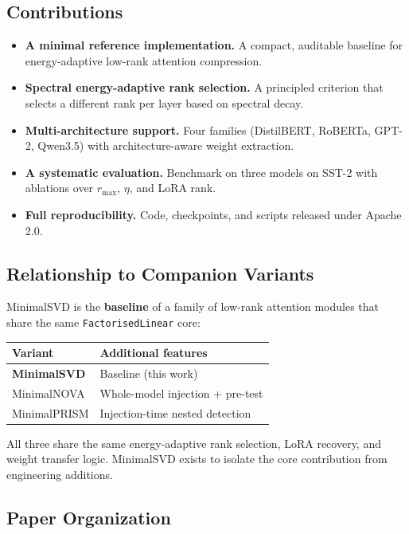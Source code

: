 \subsection{Contributions}

\begin{itemize}
\item \textbf{A minimal reference implementation.} A compact, auditable baseline for
  energy-adaptive low-rank attention compression.
\item \textbf{Spectral energy-adaptive rank selection.} A principled criterion that
  selects a different rank per layer based on spectral decay.
\item \textbf{Multi-architecture support.} Four families (DistilBERT, RoBERTa, GPT-2,
  Qwen3.5) with architecture-aware weight extraction.
\item \textbf{A systematic evaluation.} Benchmark on three models on SST-2 with
  ablations over $r_\text{max}$, $\eta$, and LoRA rank.
\item \textbf{Full reproducibility.} Code, checkpoints, and scripts released under
  Apache 2.0.

\end{itemize}
\subsection{Relationship to Companion Variants}

MinimalSVD is the \textbf{baseline} of a family of low-rank attention modules 
that share the same \texttt{FactorisedLinear} core:

\begin{table}[H]
\centering
\small
\begin{tabular}{ll}
\toprule
\textbf{Variant} & \textbf{Additional features} \\
\midrule
\textbf{MinimalSVD} & Baseline (this work) \\
MinimalNOVA & Whole-model injection + pre-test \\
MinimalPRISM & Injection-time nested detection \\
\bottomrule
\end{tabular}
\end{table}

All three share the same energy-adaptive rank selection, LoRA recovery, and 
weight transfer logic. MinimalSVD exists to isolate the core contribution 
from engineering additions.

\subsection{Paper Organization}

